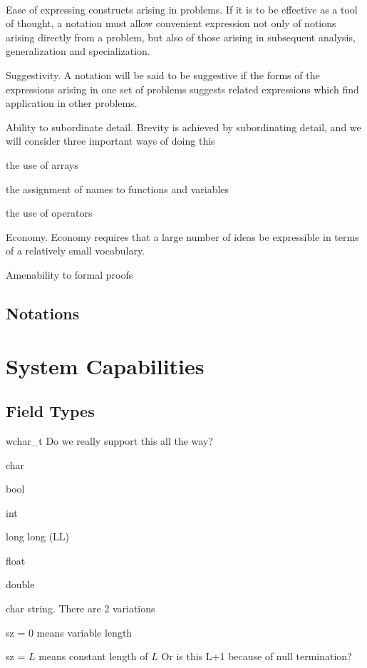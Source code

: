 {\tt 
\be
\item Ease of expressing constructs arising in problems. If it is to be
effective as a tool of thought, a notation must allow convenient
expression not only of notions arising directly from a problem, but also
of those arising in subsequent analysis, generalization and
specialization.

\item Suggestivity. A notation will be said to be suggestive if the
forms of the expressions arising in one set of problems suggests related
expressions which find application in other problems.

\item Ability to subordinate detail. Brevity is achieved by
subordinating detail, and we will consider three important ways of doing
this
\bi
\item the use of arrays
\item the assignment of names to functions and variables
\item the use of operators
\ei

\item Economy. Economy requires that a large number of ideas be
expressible in terms of a relatively small vocabulary. 

\item Amenability to formal proofs

\ee
}




\subsection{Notations}


\section{System Capabilities}

\subsection{Field Types}
\label{Field_Types}
\be
\item wchar\_t Do we really support this all the way? \TBC 
\item char
\item bool
\item int
\item long long (LL)
\item float
\item double
\item char string. There are 2 variations
\be
\item sz = 0 means variable length
\item sz = \(L\) means constant length of \(L\) Or is this L+1 because
of null termination? \TBC
\ee
\ee

